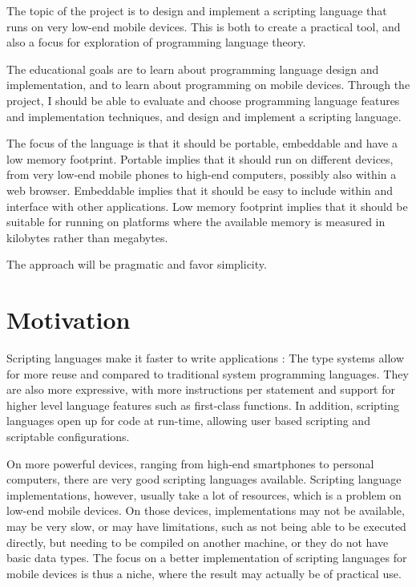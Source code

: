 \documentclass[11pt]{report}
\begin{document}
    The topic of the project is to design and implement a scripting language
that runs on very low-end mobile devices. This is both to create a practical tool, and
also a focus for exploration of programming language theory. 

\begin{comment}
The motivation is that a scripting language makes it is easier to make applications for mobile 
devices, and that existing freely available scripting languages
are very limited, slow, or simply does not run on the low-end mobile devices.
\end{comment}

    The educational goals are to learn about programming language design and
implementation, and to learn about programming on mobile devices. Through the
project, I should be able to evaluate and choose programming language features
and implementation techniques, and design and implement a scripting language.

    The focus of the language is that it should be portable, embeddable and have
a low memory footprint. Portable implies that it should run on different devices,
from very low-end mobile phones to high-end computers, possibly also within a web browser. 
Embeddable implies that it should be easy to include within and interface with
other applications. Low memory footprint implies that it should be suitable for
running on platforms where the available memory is measured in kilobytes rather
than megabytes. 

    The approach will be pragmatic and favor simplicity.

\section{Motivation}
Scripting languages make it faster to write applications \cite{ousterhout-scripting}:
The type systems allow for more reuse and compared to traditional system programming languages.
They are also more expressive, with more instructions per statement and support for higher level language features such as first-class functions.
In addition, scripting languages open up for code at run-time, allowing user based scripting and scriptable configurations.

On more powerful devices, ranging from high-end smartphones to personal computers, there are very good scripting languages available.
Scripting language implementations, however, usually take a lot of resources, which is a problem on low-end mobile devices. On those devices, implementations may not be available, may be very slow, or may have limitations, such as not being able to be executed directly, but needing to be compiled on another machine, or they do not have basic data types.
The focus on a better implementation of scripting languages for mobile devices is thus a niche, where the result may actually be of practical use.
\end{document}
